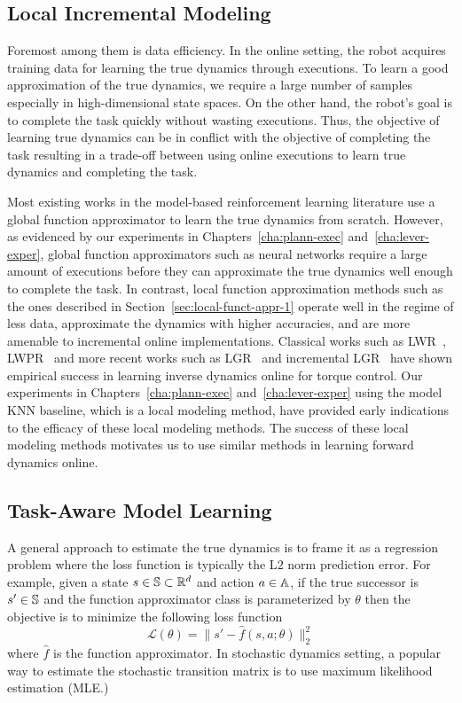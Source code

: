 \subsection{Local Incremental Modeling}
\label{sec:local-modeling}

Foremost among them is data efficiency. In the online setting, the
robot acquires training data for learning the true dynamics through
executions. To learn a good approximation of the true dynamics, we
require a large number of samples especially in high-dimensional state
spaces. On the other hand, the robot's goal is to complete the task
quickly without wasting executions. Thus, the objective of learning
true dynamics can be in conflict with the objective of completing the
task resulting in a trade-off between using online executions to learn
true dynamics and completing the task.

Most existing works in the model-based
reinforcement learning literature use a global function
approximator to learn the true dynamics from scratch. However, as
evidenced by our experiments in Chapters~\ref{cha:plann-exec}
and~\ref{cha:lever-exper}, global function approximators such as
neural networks require a large amount of executions before they can
approximate the true dynamics well enough to complete the task. In
contrast, local function approximation methods such as the ones
described in Section~\ref{sec:local-funct-appr-1} operate well in the
regime of less data, approximate the dynamics with higher accuracies, and are more
amenable to incremental online implementations. Classical works such as
LWR~\cite{DBLP:journals/air/AtkesonMS97},
LWPR~\cite{DBLP:conf/icml/VijayakumarS00} and more recent works such
as LGR~\cite{DBLP:journals/corr/MeierHS14} and incremental
LGR~\cite{DBLP:conf/nips/MeierHS14} have shown empirical success in
learning inverse dynamics online for torque
control. Our experiments in Chapters~\ref{cha:plann-exec} and~\ref{cha:lever-exper}
using the model KNN baseline, which is a local modeling method, have
provided early indications to the efficacy of these local modeling
methods. The success of these local modeling methods motivates us to
use similar methods in learning forward dynamics online. 

\subsection{Task-Aware Model Learning}
\label{sec:task-driven-learning}

A general approach to estimate the true dynamics is to frame it as a
regression problem where the loss function is typically the L$2$ norm
prediction error. For example, given a state $s \in \mathbb{S}
\subset \mathbb{R}^d$
and action $a \in \mathbb{A}$,
if the true successor is $s' \in \mathbb{S}$ and the function
approximator class is parameterized by $\theta$ then the objective is
to minimize the following loss function
\begin{equation}
  \label{eq:16}
  \mathcal{L}(\theta) = \|s' - \hat{f}(s, a; \theta)\|_2^2
\end{equation}
where $\hat{f}$ is the function approximator. In stochastic dynamics
setting, a popular way to estimate the stochastic transition matrix is
to use maximum likelihood estimation (MLE.)

